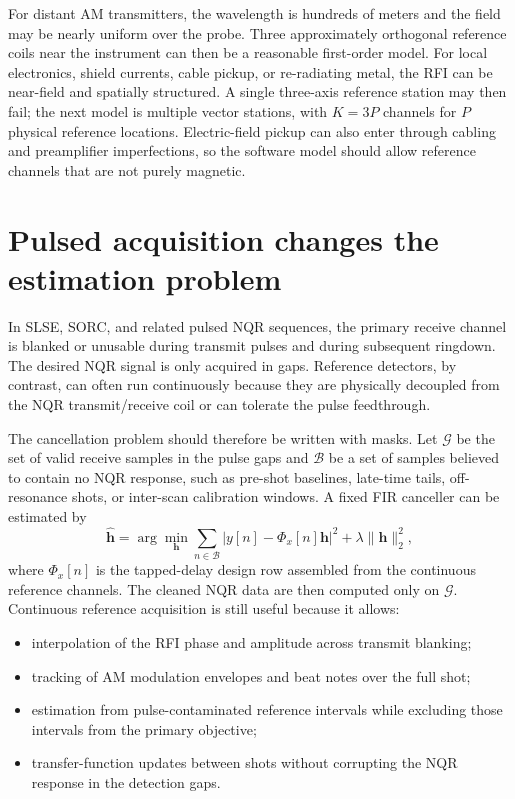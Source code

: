 \documentclass[10pt]{article}
\newcommand{\hvec}{\mathbf h}
\begin{document}
For distant AM transmitters, the wavelength is hundreds of meters and the field
may be nearly uniform over the probe.  Three approximately orthogonal
reference coils near the instrument can then be a reasonable first-order model.
For local electronics, shield currents, cable pickup, or re-radiating metal,
the RFI can be near-field and spatially structured.  A single three-axis
reference station may then fail; the next model is multiple vector stations,
with \(K=3P\) channels for \(P\) physical reference locations.  Electric-field
pickup can also enter through cabling and preamplifier imperfections, so the
software model should allow reference channels that are not purely magnetic.

\section{Pulsed acquisition changes the estimation problem}

In SLSE, SORC, and related pulsed NQR sequences, the primary receive channel is
blanked or unusable during transmit pulses and during subsequent ringdown.  The
desired NQR signal is only acquired in gaps.  Reference detectors, by contrast,
can often run continuously because they are physically decoupled from the NQR
transmit/receive coil or can tolerate the pulse feedthrough.

The cancellation problem should therefore be written with masks.  Let
\(\mathcal G\) be the set of valid receive samples in the pulse gaps and
\(\mathcal B\) be a set of samples believed to contain no NQR response, such as
pre-shot baselines, late-time tails, off-resonance shots, or inter-scan
calibration windows.  A fixed FIR canceller can be estimated by
\begin{equation}
  \widehat{\hvec}
    =
  \arg\min_{\hvec}
  \sum_{n\in\mathcal B}
  \left|y[n]-\Phi_x[n]\hvec\right|^2
  + \lambda \|\hvec\|_2^2,
  \label{eq:gated-ls}
\end{equation}
where \(\Phi_x[n]\) is the tapped-delay design row assembled from the
continuous reference channels.  The cleaned NQR data are then computed only on
\(\mathcal G\).  Continuous reference acquisition is still useful because it
allows:
\begin{itemize}
  \item interpolation of the RFI phase and amplitude across transmit blanking;
  \item tracking of AM modulation envelopes and beat notes over the full shot;
  \item estimation from pulse-contaminated reference intervals while excluding
        those intervals from the primary objective;
  \item transfer-function updates between shots without corrupting the NQR
        response in the detection gaps.
\end{itemize}
\end{document}
